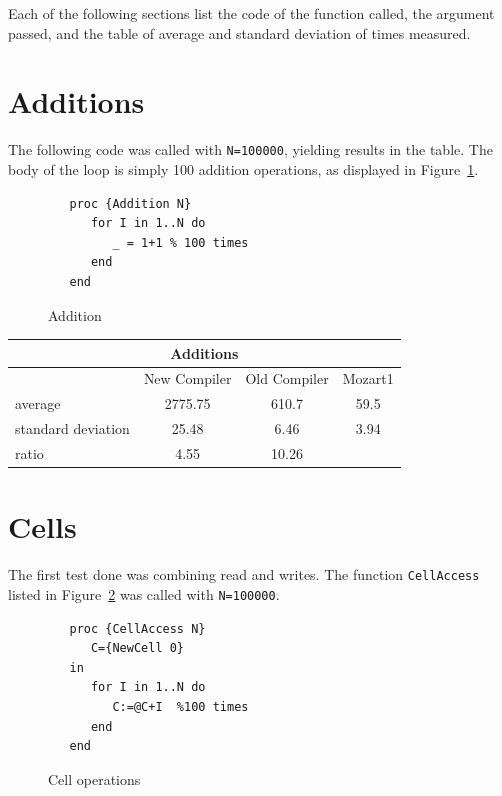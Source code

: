 \documentclass[a4paper]{memoir}
\begin{document}
\begin{appendices}
Each of the following sections list the code of the function called, the
argument passed, and the table of average and standard deviation of times measured.

\section{Additions}


The following code was called with \lstinline!N=100000!, yielding results in
the table. The body of the loop is simply 100 addition operations, as displayed in Figure~\ref{fig:app:add}.

\begin{figure}[h]
\begin{lstlisting}
   proc {Addition N}
      for I in 1..N do
         _ = 1+1 % 100 times
      end
   end
\end{lstlisting}
\caption{Addition}
\label{fig:app:add}
\end{figure}


\begin{center}
\begin{tabular} {| l c c c|}
\hline
\multicolumn{4}{|c|}{\textbf{Additions}} \\ \hline
  & New Compiler& Old Compiler & Mozart1 \\
average&2775.75&610.7&59.5 \\
standard deviation&25.48&6.46& 3.94 \\
ratio& 4.55&  10.26 & \\
\hline
\end{tabular}
\end{center}

\section{Cells}

The first test done was combining read and writes. The function
\lstinline!CellAccess! listed in Figure~\ref{fig:perfs:cellops} was called with \lstinline!N=100000!.

\begin{figure}[h]
\begin{lstlisting}
   proc {CellAccess N}
      C={NewCell 0}
   in
      for I in 1..N do
         C:=@C+I  %100 times
      end
   end
\end{lstlisting}
\caption{Cell operations}
\label{fig:perfs:cellops}
\end{figure}




\end{appendices}
\end{document}
